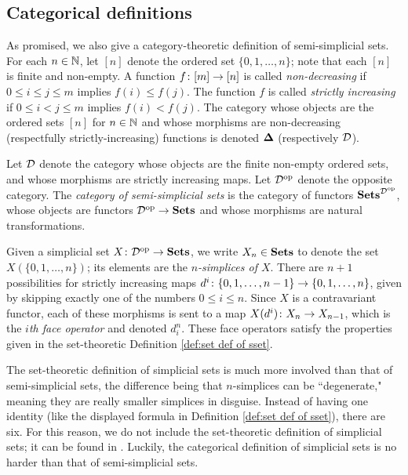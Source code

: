 \documentclass{amsart}
\def\bD{{\bf \Delta}}
\begin{document}
\subsection{Categorical definitions}

As promised, we also give a category-theoretic definition of semi-simplicial sets.  For each $n\in{\mathbb N}$, let $[n]$ denote the ordered set $\{0,1,\ldots,n\}$; note that each $[n]$ is finite and non-empty.  A function $f\colon[m]\rightarrow[n]$ is called {\em non-decreasing} if $0\leq i\leq j\leq m$ implies $f(i)\leq f(j)$.  The function $f$ is called {\em strictly increasing} if $0\leq i<j\leq m$ implies $f(i)<f(j)$.  The category whose objects are the ordered sets $[n]$ for $n\in{\mathbb N}$ and whose morphisms are non-decreasing (respectfully strictly-increasing) functions is denoted $\bD$ (respectively $\mathcal{D}$).

\begin{definition}

Let $\mathcal{D}$ denote the category whose objects are the finite non-empty ordered sets, and whose morphisms are strictly increasing maps.  Let $\mathcal{D}^\textnormal{op}$ denote the opposite category.  The {\em category of semi-simplicial sets} is the category of functors ${\bf Sets}^{\mathcal{D}^\textnormal{op}}$, whose objects are functors $\mathcal{D}^\textnormal{op}\rightarrow{\bf Sets}$ and whose morphisms are natural transformations.

\end{definition}

\begin{remark}

Given a simplicial set $X\colon\mathcal{D}^\textnormal{op}\rightarrow{\bf Sets}$, we write $X_n\in{\bf Sets}$ to denote the set $X(\{0,1,\ldots,n\})$; its elements are the {\em $n$-simplices of $X$}.  There are $n+1$ possibilities for strictly increasing maps $d^i\colon \{0,1,\ldots,n-1\}\rightarrow\{0,1,\ldots,n\}$, given by skipping exactly one of the numbers $0\leq i\leq n$.  Since $X$ is a contravariant functor, each of these morphisms is sent to a map $X(d^i)\colon X_n\rightarrow X_{n-1}$, which is the {\em $i$th face operator} and denoted $d^n_i$.  These face operators satisfy the properties given in the set-theoretic Definition \ref{def:set def of sset}.

\end{remark}

The set-theoretic definition of simplicial sets is much more involved than that of semi-simplicial sets, the difference being that $n$-simplices can be ``degenerate," meaning they are really smaller simplices in disguise.  Instead of having one identity (like the displayed formula in Definition \ref{def:set def of sset}), there are six.  For this reason, we do not include the set-theoretic definition of simplicial sets; it can be found in \cite{GJ}.  Luckily, the categorical definition of simplicial sets is no harder than that of semi-simplicial sets.  
\end{document}
